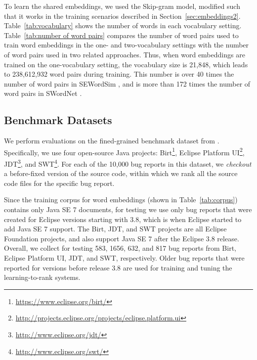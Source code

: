To learn the shared embeddings, we used the Skip-gram model, modified such that it works in the training scenarios described in Section~\ref{sec:embeddings2}. Table~\ref{tab:vocabulary} shows the number of words in each vocabulary setting.  Table~\ref{tab:number of word pairs} compares the number of word pairs used to train word embeddings in the one- and two-vocabulary settings with the number of word pairs used in two related approaches. Thus, when word embeddings are trained on the one-vocabulary setting, the vocabulary size is 21,848, which leads to 238,612,932 word pairs during training. This number is over 40 times the number of word pairs in SEWordSim \cite{Tian:2014:SSW:2591062.2591071}, and is more than 172 times the number of word pairs in SWordNet \cite{6224276}.

\subsection{Benchmark Datasets}
\label{sec:evaluation:subject systems}

We perform evaluations on the fined-grained benchmark dataset from \cite{Ye:FSE14}. Specifically, we use four open-source Java projects: Birt\footnote{\url{https://www.eclipse.org/birt/}}, Eclipse Platform UI\footnote{\url{http://projects.eclipse.org/projects/eclipse.platform.ui}}, JDT\footnote{\url{http://www.eclipse.org/jdt/}}, and SWT\footnote{\url{http://www.eclipse.org/swt/}}. For each of the 10,000 bug reports in this dataset, we {\it checkout} a before-fixed version of the source code, within which we rank all the source code files for the specific bug report.

Since the training corpus for word embeddings (shown in Table~\ref{tab:corpus}) contains only Java SE 7 documents, for testing we use only bug reports that were created for Eclipse versions starting with 3.8, which is when Eclipse started to add Java SE 7 support. The Birt, JDT, and SWT projects are all Eclipse Foundation projects, and also support Java SE 7 after the Eclipse 3.8 release. Overall, we collect for testing 583, 1656, 632, and 817 bug reports from Birt, Eclipse Platform UI, JDT, and SWT, respectively. Older bug reports that were reported for versions before release 3.8 are used for training and tuning the learning-to-rank systems.

